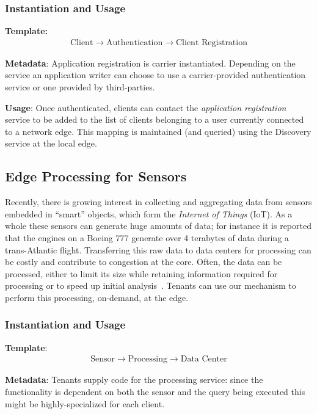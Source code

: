 \subsubsection*{Instantiation and Usage}
\indent\indent\textbf{Template:} 
\begin{align*}
\text{Client} \rightarrow \text{Authentication} \rightarrow \text{Client Registration}
\end{align*}

\textbf{Metadata}: Application registration is carrier instantiated. Depending on the service an application writer can choose to use a carrier-provided authentication service or one provided by third-parties.

\textbf{Usage}: Once authenticated, clients can contact the \emph{application registration} service to be added to the list of clients belonging to a user currently connected to a network edge. This mapping is maintained (and queried) using the Discovery service at the local edge. 

\subsection{Edge Processing for Sensors}

Recently, there is growing interest in collecting and aggregating data from sensors embedded in ``smart'' objects, 
which form the \emph{Internet of Things} (IoT). As a whole these sensors can generate huge amounts of data; for 
instance it is reported that the engines on a Boeing 777 generate over 4 terabytes of data during a trans-Atlantic
flight. Transferring this raw data to data centers for processing can be costly and contribute
to congestion at the core. Often, the data can be processed, either to limit its size while retaining information
required for processing or to speed up initial analysis~\cite{sidirourgos2011sciborq}. Tenants can use our mechanism
to perform this processing, on-demand, at the edge.

\subsubsection*{Instantiation and Usage}
\indent\indent\textbf{Template}:
\begin{align*}
\text{Sensor} \rightarrow \text{Processing} \rightarrow \text{Data Center}
\end{align*}

\textbf{Metadata}: Tenants supply code for the processing service: since the functionality is dependent on both
the sensor and the query being executed this might be highly-specialized for each client.

